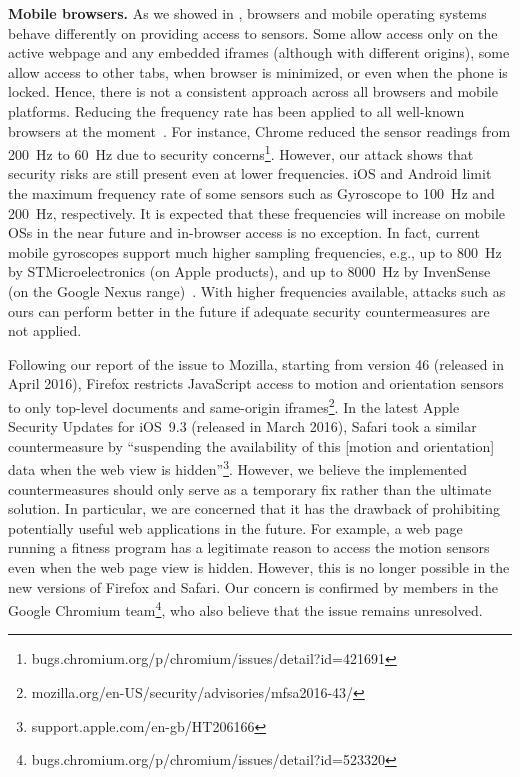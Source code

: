 \documentclass[10pt,twocolumn]{article}
\begin{document}
\textbf{Mobile browsers.} 
As we showed in \cite{Mehrnezhad}, browsers and mobile operating systems behave differently on providing access to sensors. Some allow access only on the active webpage and any embedded iframes (although with different origins), some allow access to other tabs, when browser is minimized, or even when the phone is locked. Hence, there is not a consistent approach across all browsers and mobile platforms. 
Reducing the frequency rate has been applied to all well-known browsers at the moment~\cite{Mehrnezhad}. For instance, Chrome reduced the sensor readings from 200~Hz to 60~Hz due to security concerns\footnote{bugs.chromium.org/p/chromium/issues/detail?id=421691}. 
However, our attack shows that security risks are still present even at lower frequencies. 
iOS and Android limit the maximum frequency rate of some sensors such as Gyroscope to 100~Hz and 200~Hz, respectively. It is expected that these frequencies will increase on mobile OSs in the near future and in-browser access is no exception. 
In fact, current mobile gyroscopes support much higher sampling frequencies, e.g., up to 800~Hz by STMicroelectronics (on Apple products), and up to 8000~Hz by InvenSense (on the Google Nexus range)~\cite{Speech:Gyr}. 
With higher frequencies available, attacks such as ours can perform better in the future if adequate security countermeasures are not applied. 

Following our report of the issue to Mozilla, starting from version 46 (released in April 2016), Firefox restricts JavaScript access to motion and orientation sensors to only top-level documents and same-origin iframes\footnote{mozilla.org/en-US/security/advisories/mfsa2016-43/}. 
In the latest Apple Security Updates for iOS~9.3 (released in March 2016), Safari took a similar countermeasure by ``suspending the availability of this [motion and orientation] data when the web view is hidden''\footnote{support.apple.com/en-gb/HT206166}. 
However, we believe the implemented countermeasures should only serve as a temporary fix rather than the ultimate solution. 
In particular, we are concerned that it has the drawback of prohibiting potentially useful web applications in the future.
For example, a web page running a fitness program has a legitimate reason to access the motion sensors even when the web page view is hidden. 
However, this is no longer possible in the new versions of Firefox and Safari. 
Our concern is confirmed by members in the Google Chromium team\footnote{bugs.chromium.org/p/chromium/issues/detail?id=523320}, who also believe that the issue remains unresolved. 
\end{document}
